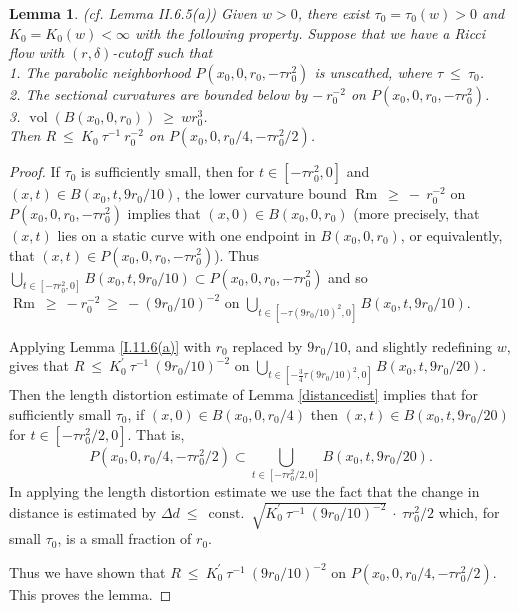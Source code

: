 \documentclass[12pt]{amsart}
\newcommand{\const}{\operatorname{const.}}
\newcommand{\Rm}{\operatorname{Rm}}
\newcommand{\vol}{\operatorname{vol}}
\newcommand{\de}{\delta}
\numberwithin{equation}{section}
\theoremstyle{plain}
\newtheorem{lemma}[equation]{Lemma}
\theoremstyle{definition}
\theoremstyle{remark}
\begin{document}
\begin{lemma} \label{II.6.5(a)}
(cf. Lemma II.6.5(a))
Given $w > 0$, there exist $\tau_0 = \tau_0(w) > 0$ and $K_0 = 
K_0(w) < \infty$ with the following property. Suppose that we have
a Ricci flow with $(r,\de)$-cutoff such that \\
1. The parabolic neighborhood
$P(x_0, 0, r_0, -\tau r_0^2)$ is unscathed,
where $\tau \: \le \: \tau_0$. \\
2. The sectional curvatures are bounded below by $- \: r_0^{-2}$ on 
$P(x_0, 0, r_0, -\tau r_0^2)$. \\
3. $\vol(B(x_0, 0, r_0)) \: \ge \: wr_0^3$. \\

Then $R \: \le \: K_0 \: \tau^{-1} \: r_0^{-2}$ on 
$P(x_0, 0, r_0/4, -\tau r_0^2/2)$.
\end{lemma}
\begin{proof}
If $\tau_0$ is sufficiently small, then for
$t \in [- \tau r_0^2, 0]$ and 
$(x,t) \in B(x_0, t, 9r_0/10)$, the lower
curvature bound 
$\Rm \: \ge \: - \: r_0^{-2}$ on $P(x_0, 0, r_0, -
\tau r_0^2)$ implies that $(x,0) \in B(x_0, 0, r_0)$ (more precisely,
that $(x,t)$ lies on a static curve with one endpoint in $B(x_0,0,r_0)$,
or equivalently, that $(x,t)\in P(x_0,0,r_0,-\tau r_0^2)$).
Thus $\bigcup_{ t \in 
[-\tau r_0^2, 0]} B(x_0, t, 9r_0/10) 
\subset P(x_0, 0, r_0, - \tau r_0^2)$ and so
$\Rm \: \ge \:-r_0^{-2}\:\ge\: - (9r_0/10)^{-2}$
 on 
$\bigcup_{t \in 
[-\tau (9r_0/10)^2, 0]} B(x_0, t, 9r_0/10)$.

Applying 
Lemma
\ref{I.11.6(a)} with $r_0$ replaced by 
$9r_0/10$, and slightly redefining $w$, gives that 
$R \: \le \: K_0^\prime \: \tau^{-1} \: (9r_0/10)^{-2}$
on $\bigcup_{t \in [- \frac34 \tau (9r_0/10)^2, 0]} B(x_0, t, 9r_0/20)$.
Then the length distortion estimate of Lemma \ref{distancedist} implies that for
sufficiently small $\tau_0$, if 
$(x,0) \in B(x_0, 0, r_0/4)$ 
then 
$(x,t) \in B(x_0, t, 9r_0/20)$ 
for
$t \in [-\tau r_0^2/2, 0]$. That is,
\begin{equation}
P(x_0, 0, r_0/4, -\tau r_0^2/2) \subset 
\bigcup_{t \in [- \tau r_0^2/2, 0]} B(x_0, t, 9r_0/20).
\end{equation}
In applying the length distortion estimate we use the fact that
the change in distance is estimated by 
$\Delta d \: \le \:
\const \: \sqrt{K_0^\prime \: \tau^{-1} \: (9r_0/10)^{-2}} \: \cdot \:
\tau r_0^2/2$
which, for small $\tau_0$, is a small fraction
of $r_0$. 

Thus we have shown that 
$R \: \le \: K_0^\prime \: \tau^{-1} \: (9r_0/10)^{-2}$
on $P(x_0, 0, r_0/4, -\tau r_0^2/2)$. 
This proves the lemma.  
\end{proof}
\end{document}
